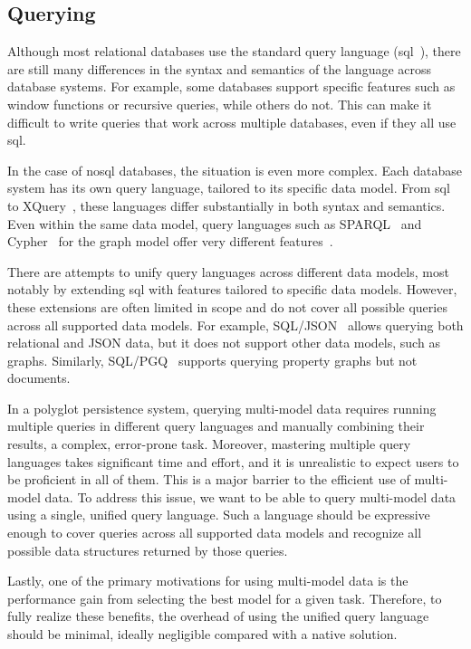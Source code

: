 \subsection{Querying}
\label{sec:querying}

Although most relational databases use the standard query language (\acrshort{sql}~\citep{SQL}), there are still many differences in the syntax and semantics of the language across database systems. For example, some databases support specific features such as window functions or recursive queries, while others do not. This can make it difficult to write queries that work across multiple databases, even if they all use \acrshort{sql}.

In the case of \acrshort{nosql} databases, the situation is even more complex. Each database system has its own query language, tailored to its specific data model. From \acrshort{sql} to XQuery~\citep{XQuery}, these languages differ substantially in both syntax and semantics. Even within the same data model, query languages such as SPARQL~\citep{sparql} and Cypher~\citep{Cypher} for the graph model offer very different features~\citep{Jiaheng2023Survey}.

There are attempts to unify query languages across different data models, most notably by extending \acrshort{sql} with features tailored to specific data models. However, these extensions are often limited in scope and do not cover all possible queries across all supported data models. For example, SQL/JSON~\citep{SQLJSON} allows querying both relational and JSON data, but it does not support other data models, such as graphs. Similarly, SQL/PGQ~\citep{SQLPGQ} supports querying property graphs but not documents.

In a polyglot persistence system, querying multi-model data requires running multiple queries in different query languages and manually combining their results, a complex, error-prone task. Moreover, mastering multiple query languages takes significant time and effort, and it is unrealistic to expect users to be proficient in all of them. This is a major barrier to the efficient use of multi-model data. To address this issue, we want to be able to query multi-model data using a single, unified query language. Such a language should be expressive enough to cover queries across all supported data models and recognize all possible data structures returned by those queries.

Lastly, one of the primary motivations for using multi-model data is the performance gain from selecting the best model for a given task. Therefore, to fully realize these benefits, the overhead of using the unified query language should be minimal, ideally negligible compared with a native solution.


